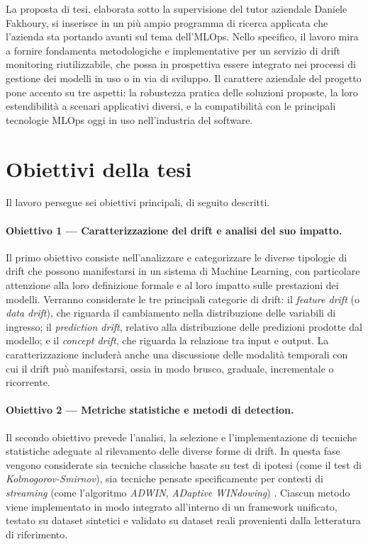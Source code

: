 La proposta di tesi, elaborata sotto la supervisione del tutor aziendale
Daniele Fakhoury, si inserisce in un più ampio programma di ricerca applicata
che l'azienda sta portando avanti sul tema dell'MLOps. Nello specifico, il
lavoro mira a fornire fondamenta metodologiche e implementative per un
servizio di drift monitoring riutilizzabile, che possa in prospettiva essere
integrato nei processi di gestione dei modelli in uso o in via di sviluppo.
Il carattere aziendale del progetto pone accento su tre aspetti: la robustezza
pratica delle soluzioni proposte, la loro estendibilità a scenari applicativi
diversi, e la compatibilità con le principali tecnologie MLOps oggi in uso
nell'industria del software.


\section{Obiettivi della tesi}
\label{sec:obiettivi}

Il lavoro persegue sei obiettivi principali, di seguito descritti.

\paragraph{Obiettivo 1 — Caratterizzazione del drift e analisi del suo impatto.}
Il primo obiettivo consiste nell'analizzare e categorizzare le diverse
tipologie di drift che possono manifestarsi in un sistema di Machine Learning,
con particolare attenzione alla loro definizione formale e al loro impatto
sulle prestazioni dei modelli. Verranno considerate le tre principali categorie
di drift: il \textit{feature drift} (o \textit{data drift}), che riguarda il
cambiamento nella distribuzione delle variabili di ingresso; il
\textit{prediction drift}, relativo alla distribuzione delle predizioni
prodotte dal modello; e il \textit{concept drift}, che riguarda la relazione
tra input e output. La caratterizzazione includerà anche una discussione delle
modalità temporali con cui il drift può manifestarsi, ossia in modo brusco,
graduale, incrementale o ricorrente.

\paragraph{Obiettivo 2 — Metriche statistiche e metodi di detection.}
Il secondo obiettivo prevede l'analisi, la selezione e l'implementazione di
tecniche statistiche adeguate al rilevamento delle diverse forme di drift. In
questa fase vengono considerate sia tecniche classiche basate su test di
ipotesi (come il test di \textit{Kolmogorov-Smirnov}), sia tecniche pensate
specificamente per contesti di \textit{streaming} (come l'algoritmo
\textit{ADWIN}, \textit{ADaptive WINdowing}) \cite{bifet2007adwin}. Ciascun
metodo viene implementato in modo integrato all'interno di un framework
unificato, testato su dataset sintetici e validato su dataset reali provenienti
dalla letteratura di riferimento.

